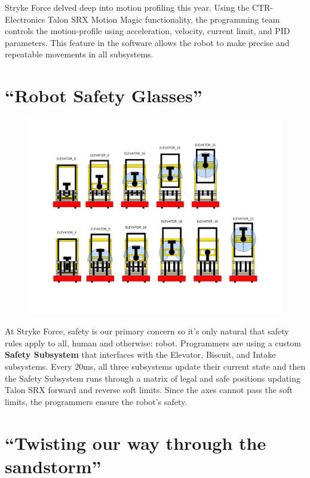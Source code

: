 \documentclass[10pt,tumble]{leaflet}
\begin{document}
Stryke Force delved deep into motion profiling this year.  Using the CTR-Electronics Talon SRX Motion Magic functionality, the programming team controls the motion-profile using acceleration, velocity, current limit, and PID parameters.  This feature in the software allows the robot to make precise and repeatable movements in all subsystems.

\section{``Robot Safety Glasses''}

\begin{figure}[H]
	\centering
	\includegraphics[scale=0.3]{assets/safety}
\end{figure}

At Stryke Force, safety is our primary concern so it's only natural that safety rules apply to all, human and otherwise: robot. Programmers are using a custom \textbf{Safety Subsystem} that interfaces with the Elevator, Biscuit, and Intake subsystems. Every 20ms, all three subsystems update their current state and then the Safety Subsystem runs through a matrix of legal and safe positions updating Talon SRX forward and reverse soft limits. Since the axes cannot pass the soft limits, the programmers ensure the robot's safety.

\section{``Twisting our way through the sandstorm''}
\end{document}
